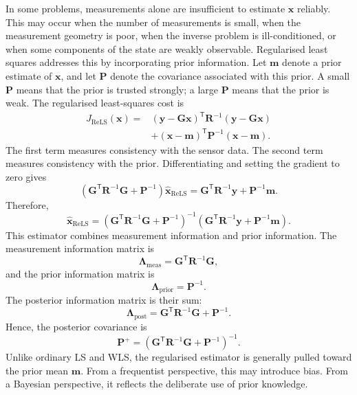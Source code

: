 \documentclass{ieeeaccess}
\begin{document}
In some problems, measurements alone are insufficient to estimate $\mathbf{x}$ reliably. This may occur when the number of measurements is small, when the measurement geometry is poor, when the inverse problem is ill-conditioned, or when some components of the state are weakly observable. Regularised least squares addresses this by incorporating prior information. Let $\mathbf{m}$ denote a prior estimate of $\mathbf{x}$, and let $\mathbf{P}$ denote the covariance associated with this prior. A small $\mathbf{P}$ means that the prior is trusted strongly; a large $\mathbf{P}$ means that the prior is weak. The regularised least-squares cost is
\begin{align}
J_{\mathrm{ReLS}}(\mathbf{x})
=&
\left(
\mathbf{y}
-
\mathbf{G}\mathbf{x}
\right)^{\mathsf T}
\mathbf{R}^{-1}
\left(
\mathbf{y}
-
\mathbf{G}\mathbf{x}
\right) \nonumber \\
&+
\left(
\mathbf{x}
-
\mathbf{m}
\right)^{\mathsf T}
\mathbf{P}^{-1}
\left(
\mathbf{x}
-
\mathbf{m}
\right).
\end{align}
The first term measures consistency with the sensor data. The second term measures consistency with the prior. Differentiating and setting the gradient to zero gives
\begin{equation}
\left(
\mathbf{G}^{\mathsf T}
\mathbf{R}^{-1}
\mathbf{G}
+
\mathbf{P}^{-1}
\right)
\widehat{\mathbf{x}}_{\mathrm{ReLS}}
=
\mathbf{G}^{\mathsf T}
\mathbf{R}^{-1}
\mathbf{y}
+
\mathbf{P}^{-1}
\mathbf{m}.
\end{equation}
Therefore,
\begin{equation}
\widehat{\mathbf{x}}_{\mathrm{ReLS}}
=
\left(
\mathbf{G}^{\mathsf T}
\mathbf{R}^{-1}
\mathbf{G}
+
\mathbf{P}^{-1}
\right)^{-1}
\left(
\mathbf{G}^{\mathsf T}
\mathbf{R}^{-1}
\mathbf{y}
+
\mathbf{P}^{-1}
\mathbf{m}
\right).
\end{equation}
This estimator combines measurement information and prior information. The measurement information matrix is
\begin{equation}
\mathbf{\Lambda}_{\mathrm{meas}}
=
\mathbf{G}^{\mathsf T}
\mathbf{R}^{-1}
\mathbf{G},
\end{equation}
and the prior information matrix is
\begin{equation}
\mathbf{\Lambda}_{\mathrm{prior}}
=
\mathbf{P}^{-1}.
\end{equation}
The posterior information matrix is their sum:
\begin{equation}
\mathbf{\Lambda}_{\mathrm{post}}
=
\mathbf{G}^{\mathsf T}
\mathbf{R}^{-1}
\mathbf{G}
+
\mathbf{P}^{-1}.
\end{equation}
Hence, the posterior covariance is
\begin{equation}
\mathbf{P}^{+}
=
\left(
\mathbf{G}^{\mathsf T}
\mathbf{R}^{-1}
\mathbf{G}
+
\mathbf{P}^{-1}
\right)^{-1}.
\end{equation}
Unlike ordinary LS and WLS, the regularised estimator is generally pulled toward the prior mean $\mathbf{m}$. From a frequentist perspective, this may introduce bias. From a Bayesian perspective, it reflects the deliberate use of prior knowledge.
\end{document}
